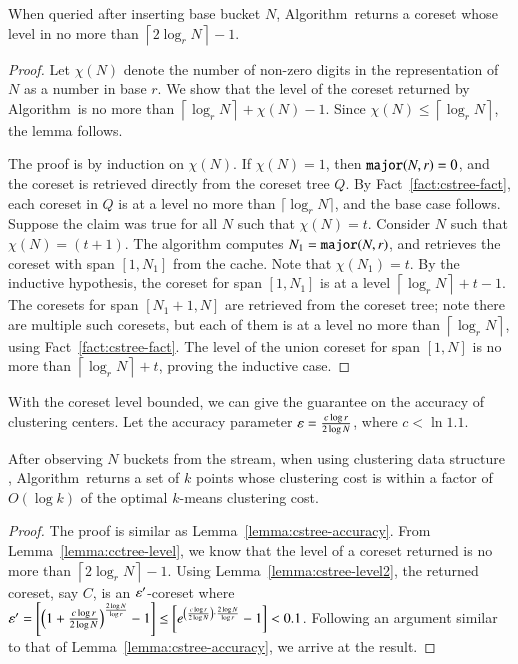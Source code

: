 \begin{lemma}
\label{lemma:cctree-level}
When queried after inserting base bucket $N$, Algorithm~\cccoreset returns a coreset 
whose level in no more than $\left\lceil 2 \log_r N \right\rceil - 1$.
\end{lemma}
\begin{proof}
Let $\chi(N)$ denote the number of non-zero digits in the representation of $N$ as a number in base $r$. 
We show that the level of the coreset returned by Algorithm~\cccoreset is no more than 
$\left\lceil \log_r N \right\rceil + \chi(N)-1$. 
Since $\chi(N) \le \left\lceil \log_r N \right\rceil$, the lemma follows.

The proof is by induction on $\chi(N)$. If $\chi(N)=1$, then $\texttt{major}(N,r)=0$,
and the coreset is retrieved directly from the coreset tree $Q$. 
By Fact~\ref{fact:cstree-fact}, each coreset in $Q$ is at a level 
no more than $\lceil \log_r N \rceil$, and the base case follows. 
Suppose the claim was true for all $N$ such that $\chi(N) = t$. Consider $N$ such that
$\chi(N)=(t+1)$. The algorithm computes $N_1 = \texttt{major} (N,r)$, and retrieves the
coreset with span $[1,N_1]$ from the cache. Note that $\chi(N_1) = t$. By the
inductive hypothesis, the coreset for span $[1,N_1]$ is at a level
$\left\lceil \log_r N \right\rceil + t - 1$. The coresets for span
$[N_1+1,N]$ are retrieved from the coreset tree; note there are multiple such
coresets, but each of them is at a level no more than
$\left\lceil \log_r N \right\rceil$, using Fact~\ref{fact:cstree-fact}.  
The level of the union coreset for span $[1,N]$ is no more than
$\left\lceil \log_r N \right\rceil + t$, proving the inductive case.
\end{proof}

With the coreset level bounded, we can give the guarantee on the accuracy of clustering centers.
Let the accuracy parameter $\varepsilon=\frac{c \log r}{2\log N}$, where $c < \ln{1.1}$.
\begin{lemma}
\label{lemma:cctree-accuracy}
After observing $N$ buckets from the stream, when using clustering data structure \cc, 
Algorithm~\clusterquery returns a set of $k$ points whose clustering cost 
is within a factor of $O(\log k)$ of the optimal $k$-means clustering cost.
\end{lemma}
\begin{proof}
The proof is similar as Lemma~\ref{lemma:cstree-accuracy}. From Lemma~\ref{lemma:cctree-level}, 
we know that the level of a coreset returned is no more than $\left\lceil 2 \log_r N \right\rceil - 1$. 
Using Lemma~\ref{lemma:cstree-level2}, the returned coreset, say $C$, is an $\varepsilon'$-coreset where 
$\varepsilon' = \left[ \left(1 + \frac{{c}\log r}{2\log N}\right)^{\frac{2\log N}{\log r}} - 1 \right] \le \left[ e^{\left(\frac{{c}\log r}{2\log N}\right) \cdot \frac{2\log N}{\log r}}-1 \right] < 0.1$.
Following an argument similar to that of Lemma~\ref{lemma:cstree-accuracy}, we arrive at the result.
\end{proof}


